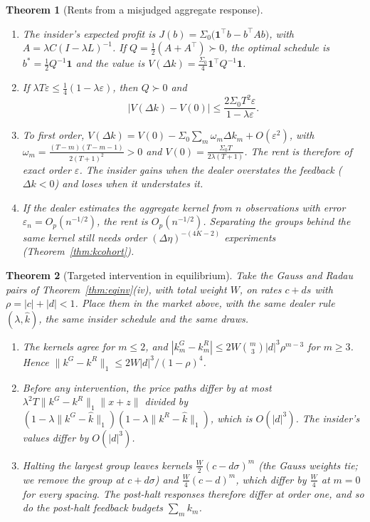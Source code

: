\documentclass[12pt]{article}
\newtheorem{theorem}{Theorem}[section]
\theoremstyle{definition}
\theoremstyle{remark}
\begin{document}
\begin{theorem}[Rents from a misjudged aggregate response]\label{thm:rents}
\begin{enumerate}[label=(\roman*),itemsep=1pt]
\item The insider's expected profit is $J(b)=\Sigma_0\bigl(\mathbf 1^\top b-b^\top A b\bigr)$, with $A=\lambda C(I-\lambda L)^{-1}$. If $Q=\tfrac12(A+A^\top)\succ0$, the optimal schedule is $b^*=\tfrac12Q^{-1}\mathbf1$ and the value is $V(\Delta k)=\tfrac{\Sigma_0}4\mathbf1^\top Q^{-1}\mathbf1$.
\item If $\lambda T\varepsilon\le\tfrac14(1-\lambda\varepsilon)$, then $Q\succ0$ and
\[
 |V(\Delta k)-V(0)|\le\frac{2\Sigma_0T^2\varepsilon}{1-\lambda\varepsilon}.
\]
\item To first order, $V(\Delta k)=V(0)-\Sigma_0\sum_m\omega_m\Delta k_m+O(\varepsilon^2)$, with $\omega_m=\frac{(T-m)(T-m-1)}{2(T+1)^2}>0$ and $V(0)=\frac{\Sigma_0T}{2\lambda(T+1)}$. The rent is therefore of exact order $\varepsilon$. The insider gains when the dealer overstates the feedback ($\Delta k<0$) and loses when it understates it.
\item If the dealer estimates the aggregate kernel from $n$ observations with error $\varepsilon_n=O_p(n^{-1/2})$, the rent is $O_p(n^{-1/2})$. Separating the groups behind the same kernel still needs order $(\Delta\eta)^{-(4K-2)}$ experiments (Theorem~\ref{thm:kcohort}).
\end{enumerate}
\end{theorem}

\begin{theorem}[Targeted intervention in equilibrium]\label{thm:eqhalt}
Take the Gauss and Radau pairs of Theorem~\ref{thm:eqinv}(iv), with total weight $W$, on rates $c+ds$ with $\rho=|c|+|d|<1$. Place them in the market above, with the same dealer rule $(\lambda,\hat k)$, the same insider schedule and the same draws.
\begin{enumerate}[label=(\roman*),itemsep=1pt]
\item The kernels agree for $m\le2$, and $|k^G_m-k^R_m|\le2W\binom m3|d|^3\rho^{m-3}$ for $m\ge3$. Hence $\|k^G-k^R\|_1\le2W|d|^3/(1-\rho)^4$.
\item Before any intervention, the price paths differ by at most $\lambda^2T\|k^G-k^R\|_1\|x+z\|$ divided by $(1-\lambda\|k^G-\hat k\|_1)(1-\lambda\|k^R-\hat k\|_1)$, which is $O(|d|^3)$. The insider's values differ by $O(|d|^3)$.
\item Halting the largest group leaves kernels $\tfrac W2(c-d\sigma)^m$ (the Gauss weights tie; we remove the group at $c+d\sigma$) and $\tfrac W4(c-d)^m$, which differ by $\tfrac W4$ at $m=0$ for every spacing. The post-halt responses therefore differ at order one, and so do the post-halt feedback budgets $\sum_mk_m$.
\end{enumerate}
\end{theorem}
\end{document}
